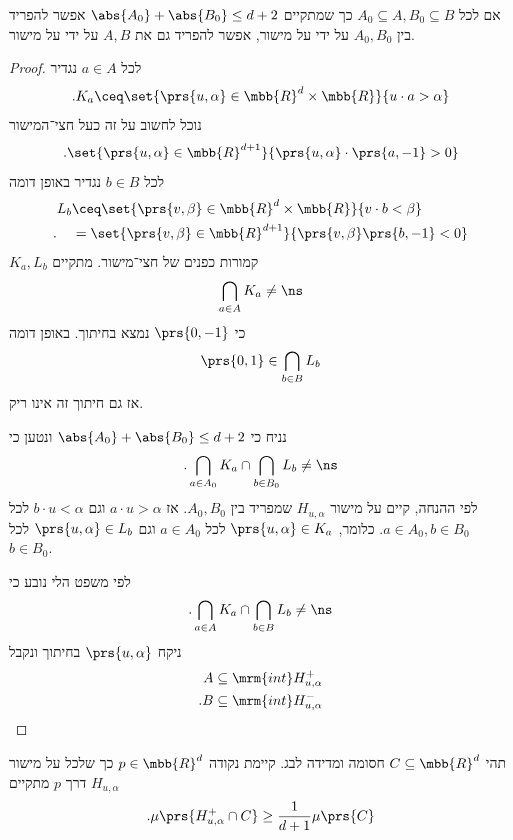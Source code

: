 \documentclass[a4paper,10pt,twoside,openany]{book}
\begin{document}
\begin{theorem}[קירכנברגר]
אם לכל
$A_0 \subseteq A, B_0 \subseteq B$
כך שמתקיים
$\abs{A_0} + \abs{B_0} \leq d+2$
אפשר להפריד בין
$A_0, B_0$
על ידי על מישור, אפשר להפריד גם את
$A,B$
על ידי על מישור.
\end{theorem}

\begin{proof}
לכל
$a \in A$
נגדיר
\[\text{.} K_a \ceq \set{\prs{u,\alpha} \in \mbb{R}^d \times \mbb{R}}{u \cdot a > \alpha}\]
נוכל לחשוב על זה כעל חצי־המישור
\[\text{.} \set{\prs{u,\alpha} \in \mbb{R}^{d+1}}{\prs{u,\alpha} \cdot \prs{a,-1} > 0}\]
לכל
$b \in B$
נגדיר באופן דומה
\begin{align*}
L_b &\ceq \set{\prs{v,\beta} \in \mbb{R}^d \times \mbb{R}}{v \cdot b < \beta}
\\ \text{.} \hphantom{L_b} &= \set{\prs{v,\beta} \in \mbb{R}^{d+1}}{\prs{v,\beta}\prs{b,-1} < 0} 
\end{align*}
$K_a, L_b$
קמורות כפנים של חצי־מישור.
מתקיים
\[\bigcap_{a \in A} K_a \neq \ns\]
כי
$\prs{0,-1}$
נמצא בחיתוך.
באופן דומה
\[\prs{0,1} \in \bigcap_{b \in B} L_b\]
אז גם חיתוך זה אינו ריק.

נניח כי
$\abs{A_0} + \abs{B_0} \leq d+2$
ונטען כי
\begin{align*}
\text{.} \bigcap_{a \in A_0} K_a \cap \bigcap_{b \in B_0} L_b \neq \ns
\end{align*}
לפי ההנחה, קיים על מישור
$H_{u,\alpha}$
שמפריד בין
$A_0, B_0$.
אז
$a \cdot u > \alpha$
וגם
$b \cdot u < \alpha$
לכל
$a \in A_0, b \in B_0$.
כלומר,
$\prs{u,\alpha} \in K_a$
לכל
$a \in A_0$
וגם
$\prs{u,\alpha} \in L_b$
לכל
$b \in B_0$.

לפי משפט הלי נובע כי
\[\text{.} \bigcap_{a \in A} K_a \cap \bigcap_{b \in B} L_b \neq \ns\]
ניקח
$\prs{u,\alpha}$
בחיתוך ונקבל
\begin{align*}
A &\subseteq \mrm{int} H_{u,\alpha}^+ \\
\text{.} B &\subseteq \mrm{int} H_{u,\alpha}^-
\end{align*}
\end{proof}

\begin{theorem}[רדו]
תהי
$C \subseteq \mbb{R}^d$
חסומה ומדידה לבג.
קיימת נקודה
$p \in \mbb{R}^d$
כך שלכל על מישור
$H_{u,\alpha}$
דרך
$p$
מתקיים
\[\text{.} \mu\prs{H_{u,\alpha}^+ \cap C} \geq \frac{1}{d+1} \mu\prs{C}\]
\end{theorem}
\end{document}

